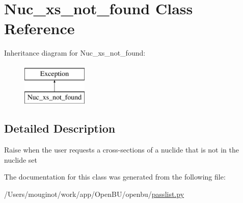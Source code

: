 \hypertarget{classopenbu_1_1passlist_1_1_nuc__xs__not__found}{}\section{Nuc\+\_\+xs\+\_\+not\+\_\+found Class Reference}
\label{classopenbu_1_1passlist_1_1_nuc__xs__not__found}
Inheritance diagram for Nuc\+\_\+xs\+\_\+not\+\_\+found\+:\begin{figure}[H]
\begin{center}
\leavevmode
\includegraphics[height=2.000000cm]{classopenbu_1_1passlist_1_1_nuc__xs__not__found}
\end{center}
\end{figure}


\subsection{Detailed Description}
\begin{DoxyVerb}Raise when the user requests a cross-sections of a nuclide that is not in the nuclide set \end{DoxyVerb}
 

The documentation for this class was generated from the following file\+:\begin{DoxyCompactItemize}
\item 
/\+Users/mouginot/work/app/\+Open\+B\+U/openbu/\mbox{\hyperlink{passlist_8py}{passlist.\+py}}\end{DoxyCompactItemize}
